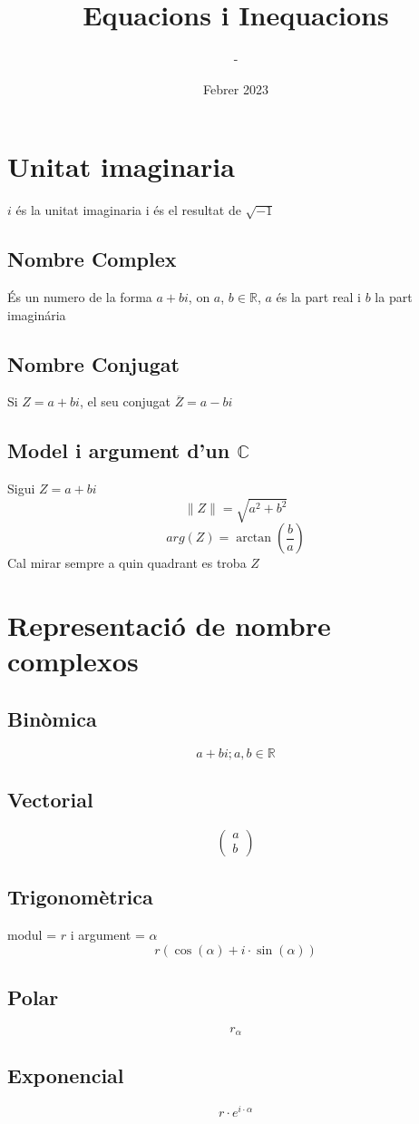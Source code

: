 \documentclass[12pt,a4paper]{article}
\title{Equacions i Inequacions}
\author{-}
\date{Febrer 2023}
\newcommand{\reals}{\mathbb{R}}
\newcommand{\module}[1]{\|#1\|}
\newcommand{\complex}{\mathbb{C}}
\begin{document}
\maketitle
\section{Unitat imaginaria}
$i$ és la unitat imaginaria i és el resultat de $\sqrt{-1}$
\subsection{Nombre Complex}
És un numero de la forma $a+bi$, on $a$, $b \in \reals$, $a$ és la part real i $b$ la part imaginária
\subsection{Nombre Conjugat}
Si $Z=a+bi$, el seu conjugat $\overline{Z}=a-bi$
\subsection{Model i argument d'un $\complex$}
Sigui $Z=a+bi$
$$\module{Z}=\sqrt{a^2+b^2}$$
$$arg(Z)=\arctan\left(\frac{b}{a}\right)$$
Cal mirar sempre a quin quadrant es troba $Z$
\section{Representació de nombre complexos}
\subsection{Binòmica}
$$a+bi; a,b \in \reals$$
\subsection{Vectorial}
$$\begin{pmatrix}
    a\\
    b
\end{pmatrix}$$
\subsection{Trigonomètrica}
modul = $r$ i argument = $\alpha$
$$r\left(\cos\left(\alpha\right)+i\cdot\sin\left(\alpha\right)\right)$$
\subsection{Polar}
$$r_{\alpha}$$
\subsection{Exponencial}
$$r\cdot e^{i\cdot\alpha}$$
\end{document}
